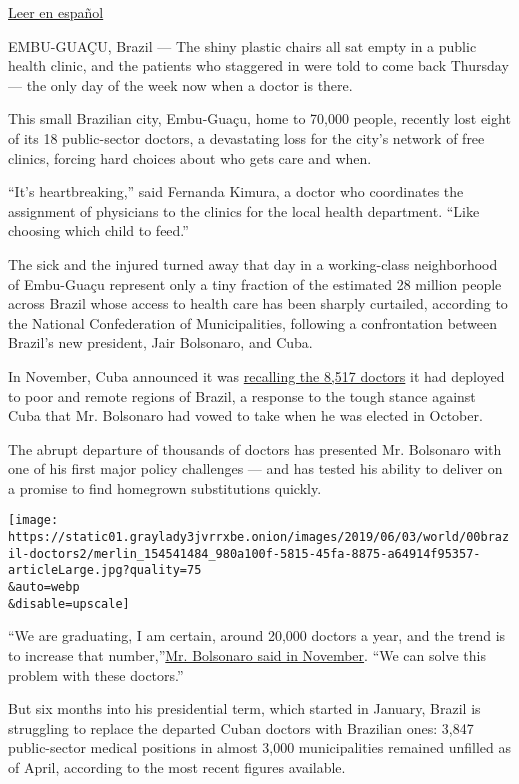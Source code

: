 \href{https://www.nytimes3xbfgragh.onion/es/2019/06/11/medicos-cubanos-brasil-bolsonaro/}{Leer
en español}

EMBU-GUAÇU, Brazil --- The shiny plastic chairs all sat empty in a
public health clinic, and the patients who staggered in were told to
come back Thursday --- the only day of the week now when a doctor is
there.

This small Brazilian city, Embu-Guaçu, home to 70,000 people, recently
lost eight of its 18 public-sector doctors, a devastating loss for the
city's network of free clinics, forcing hard choices about who gets care
and when.

``It's heartbreaking,'' said Fernanda Kimura, a doctor who coordinates
the assignment of physicians to the clinics for the local health
department. ``Like choosing which child to feed.''

The sick and the injured turned away that day in a working-class
neighborhood of Embu-Guaçu represent only a tiny fraction of the
estimated 28 million people across Brazil whose access to health care
has been sharply curtailed, according to the National Confederation of
Municipalities, following a confrontation between Brazil's new
president, Jair Bolsonaro, and Cuba.

In November, Cuba announced it was
\href{https://www.nytimes3xbfgragh.onion/2018/11/14/world/americas/brazil-cuba-doctors-jair-bolsonaro.html}{recalling
the 8,517 doctors} it had deployed to poor and remote regions of Brazil,
a response to the tough stance against Cuba that Mr. Bolsonaro had vowed
to take when he was elected in October.

The abrupt departure of thousands of doctors has presented Mr. Bolsonaro
with one of his first major policy challenges --- and has tested his
ability to deliver on a promise to find homegrown substitutions quickly.

\texttt{[image: https://static01.graylady3jvrrxbe.onion/images/2019/06/03/world/00brazil-doctors2/merlin\_154541484\_980a100f-5815-45fa-8875-a64914f95357-articleLarge.jpg?quality=75\\\&auto=webp\\\&disable=upscale]}

``We are graduating, I am certain, around 20,000 doctors a year, and the
trend is to increase that
number,''\href{http://agenciabrasil.ebc.com.br/politica/noticia/2018-11/bolsonaro-diz-que-programa-mais-medicos-nao-sera-suspenso}{Mr.
Bolsonaro said in November}. ``We can solve this problem with these
doctors.''

But six months into his presidential term, which started in January,
Brazil is struggling to replace the departed Cuban doctors with
Brazilian ones: 3,847 public-sector medical positions in almost 3,000
municipalities remained unfilled as of April, according to the most
recent figures available.

